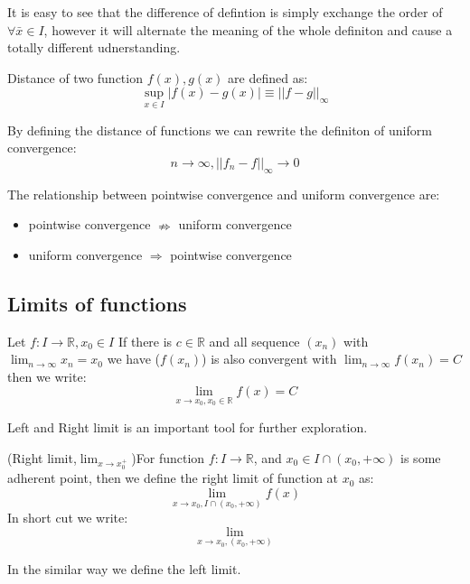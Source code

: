 \documentclass{article}
\newcommand{\R}{\mathbb{R}}
\begin{document}
It is easy to see that the difference of defintion is simply exchange the order of $\forall \bar{x}\in I$, however it will alternate the meaning of the whole definiton and cause a totally different udnerstanding.

\begin{definition}
	Distance of two function $f(x),g(x)$ are defined as:
	\begin{equation*}
		\sup_{x\in I} |f(x)-g(x)|\equiv ||f-g||_{\infty}
	\end{equation*}
\end{definition}

By defining the distance of functions we can rewrite the definiton of uniform convergence:
\begin{equation*}
	 n\to \infty, ||f_n-f||_{\infty}\to 0
\end{equation*}

\begin{theorem}
	The relationship between pointwise convergence and uniform convergence are:
	\begin{itemize}
		\item pointwise convergence $\nRightarrow$ uniform convergence
		\item uniform convergence $\Rightarrow$ pointwise convergence
	\end{itemize}
\end{theorem}

\subsection{Limits of functions}
\begin{definition}
	Let $f: I \to \R, x_0\in I$ If there is $c\in \R$ and all sequence $(x_n)$ with $\lim_{n\to \infty}x_n=x_0$ we have ($f(x_n)$) is also convergent with $\lim_{n\to \infty}f(x_n)=C$ then we write:
	\begin{equation*}
		\lim_{x\to x_0,x_0\in \R}f(x)=C
	\end{equation*}
\end{definition}
Left and Right limit is an important tool for further exploration.
\begin{definition}
	(Right limit,$\lim_{x\to x_0^+}$)For function $f:I\to \R$, and $x_0\in I\cap (x_0,+\infty)$ is some adherent point, then we define the right limit of function at $x_0$ as:
	\begin{equation*}
		\lim_{x\to x_0,I\cap (x_0,+\infty)} f(x)
	\end{equation*}
	In short cut we write:
	\begin{equation*}
		\lim_{x\to x_0,(x_0,+\infty)}
	\end{equation*}
\end{definition}
In the similar way we define the left limit.
\end{document}
